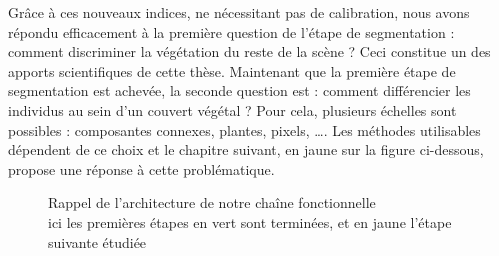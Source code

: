 \documentclass[../thesis.tex]{subfiles}
\begin{document}
    Grâce à ces nouveaux indices, ne nécessitant pas de calibration, nous avons répondu efficacement à la première question de l'étape de segmentation : comment discriminer la végétation du reste de la scène ? Ceci constitue un des apports scientifiques de cette thèse. Maintenant que la première étape de segmentation est achevée, la seconde question est : comment différencier les individus au sein d'un couvert végétal ? Pour cela, plusieurs échelles sont possibles : composantes connexes, plantes, pixels, \dots. Les méthodes utilisables dépendent de ce choix et le chapitre suivant, en jaune sur la figure ci-dessous, propose une réponse à cette problématique. %
    
   	\begin{figure}[H]
        
        \centering
        \vspace{-1em}
        
        {Rappel de l'architecture de notre chaîne fonctionnelle \\ ici les premières étapes en vert sont terminées, et en jaune l'étape suivante étudiée}
    \end{figure}
\end{document}
